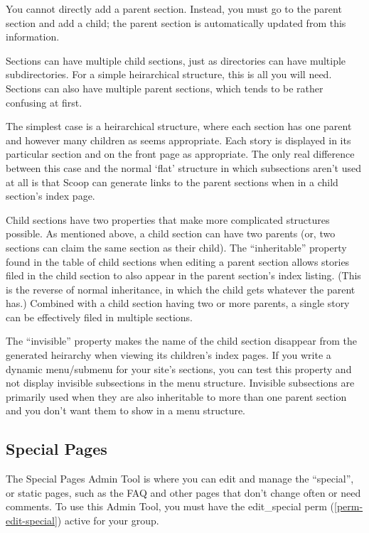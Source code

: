 You cannot directly add a parent section. Instead, you must go to the parent section and add a child; the parent section is automatically updated from this information.

Sections can have multiple child sections, just as directories can have multiple subdirectories. For a simple heirarchical structure, this is all you will need. Sections can also have multiple parent sections, which tends to be rather confusing at first.

The simplest case is a heirarchical structure, where each section has one parent and however many children as seems appropriate. Each story is displayed in its particular section and on the front page as appropriate. The only real difference between this case and the normal `flat' structure in which subsections aren't used at all is that Scoop can generate links to the parent sections when in a child section's index page.

Child sections have two properties that make more complicated structures possible. As mentioned above, a child section can have two parents (or, two sections can claim the same section as their child). The ``inheritable'' property found in the table of child sections when editing a parent section allows stories filed in the child section to also appear in the parent section's index listing. (This is the reverse of normal inheritance, in which the child gets whatever the parent has.) Combined with a child section having two or more parents, a single story can be effectively filed in multiple sections.

The ``invisible'' property makes the name of the child section disappear from the generated heirarchy when viewing its children's index pages. If you write a dynamic menu/submenu for your site's sections, you can test this property and not display invisible subsections in the menu structure. Invisible subsections are primarily used when they are also inheritable to more than one parent section and you don't want them to show in a menu structure.

\subsection{Special Pages}
\label{admin-tools-special-pages}

The Special Pages Admin Tool is where you can edit and manage the ``special'', or static pages, such as the FAQ and other pages that don't change often or need comments.  To use this Admin Tool, you must have the edit\_special perm (\ref{perm-edit-special}) active for your group.

